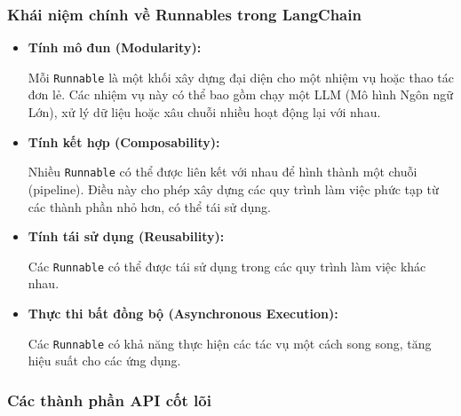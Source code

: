 \documentclass[11pt]{article}
\begin{document}
\subsubsection*{Khái niệm chính về Runnables trong LangChain}
\begin{itemize}
    \item \textbf{Tính mô đun (Modularity):}
    \begin{boxC}
        Mỗi \texttt{Runnable} là một khối xây dựng đại diện cho một nhiệm vụ hoặc thao tác đơn lẻ. Các nhiệm vụ này có thể bao gồm chạy một LLM (Mô hình Ngôn ngữ Lớn), xử lý dữ liệu hoặc xâu chuỗi nhiều hoạt động lại với nhau.
    \end{boxC}

    \item \textbf{Tính kết hợp (Composability):}
    \begin{boxC}
        Nhiều \texttt{Runnable} có thể được liên kết với nhau để hình thành một chuỗi (pipeline). Điều này cho phép xây dựng các quy trình làm việc phức tạp từ các thành phần nhỏ hơn, có thể tái sử dụng.
    \end{boxC}

    \item \textbf{Tính tái sử dụng (Reusability):}
    \begin{boxC}
        Các \texttt{Runnable} có thể được tái sử dụng trong các quy trình làm việc khác nhau.
    \end{boxC}

    \item \textbf{Thực thi bất đồng bộ (Asynchronous Execution):}
    \begin{boxC}
        Các \texttt{Runnable} có khả năng thực hiện các tác vụ một cách song song, tăng hiệu suất cho các ứng dụng.
    \end{boxC}
\end{itemize}

\subsubsection*{Các thành phần API cốt lõi}
\end{document}
